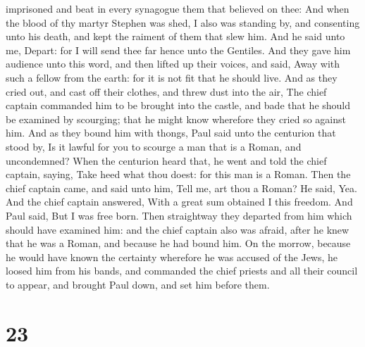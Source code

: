 imprisoned and beat in every synagogue them that believed on thee:
 And when the blood of thy martyr Stephen was shed, I also
was standing by, and consenting unto his death, and kept the raiment of
them that slew him.  And he said unto me, Depart: for I
will send thee far hence unto the Gentiles.  And they gave
him audience unto this word, and then lifted up their voices, and said,
Away with such a fellow from the earth: for it is not fit that he should
live.  And as they cried out, and cast off their clothes,
and threw dust into the air,  The chief captain commanded
him to be brought into the castle, and bade that he should be examined
by scourging; that he might know wherefore they cried so against him.
 And as they bound him with thongs, Paul said unto the
centurion that stood by, Is it lawful for you to scourge a man that is a
Roman, and uncondemned?  When the centurion heard that, he
went and told the chief captain, saying, Take heed what thou doest: for
this man is a Roman.  Then the chief captain came, and said
unto him, Tell me, art thou a Roman? He said, Yea.  And the
chief captain answered, With a great sum obtained I this freedom. And
Paul said, But I was free born.  Then straightway they
departed from him which should have examined him: and the chief captain
also was afraid, after he knew that he was a Roman, and because he had
bound him.  On the morrow, because he would have known the
certainty wherefore he was accused of the Jews, he loosed him from his
bands, and commanded the chief priests and all their council to appear,
and brought Paul down, and set him before them.

\hypertarget{section-22}{%
\section{23}\label{section-22}}

